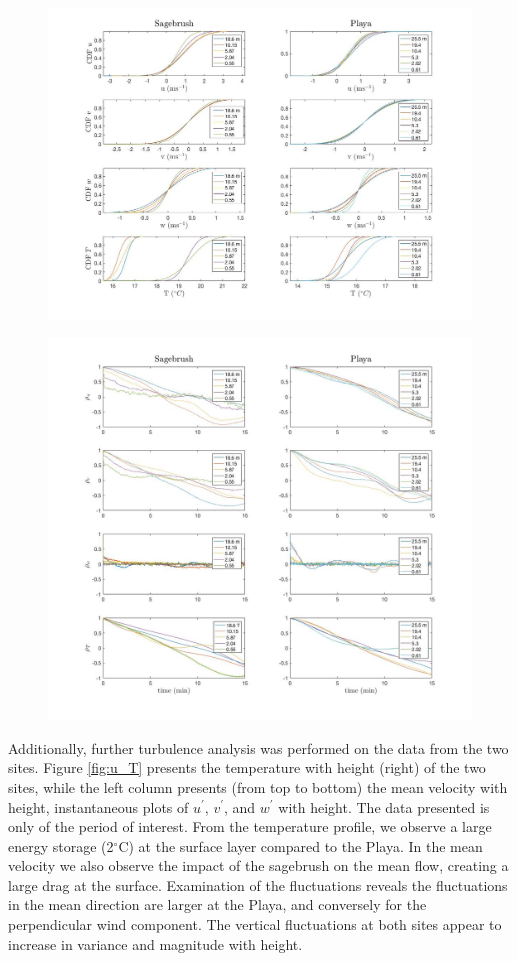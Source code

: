 \documentclass[]{article}
\begin{document}
\begin{figure}
\centering
\includegraphics[width=\textwidth]{cdf}
\caption{}
\label{fig:cdf}
\end{figure}
\begin{figure}
	\centering
	\includegraphics[width=\textwidth]{auto_corr_fig}
	\caption{}
	\label{fig:autocorr}
\end{figure}
Additionally, further turbulence analysis was performed on the data from the two sites. Figure \ref{fig:u_T} presents the temperature with height (right) of the two sites, while the left column presents (from top to bottom) the mean velocity with height, instantaneous plots of $u^\prime$,  $v^\prime$, and $w^\prime$ with height. The data presented is only of the period of interest. From the temperature profile, we observe a large energy storage (2$^\circ$C) at the surface layer compared to the Playa. In the mean velocity we also observe the impact of the sagebrush on the mean flow, creating a large drag at the surface. Examination of the fluctuations reveals the fluctuations in the mean direction are larger at the Playa, and conversely for the perpendicular wind component. The vertical fluctuations at both sites appear to increase in variance and magnitude with height.  
\end{document}
